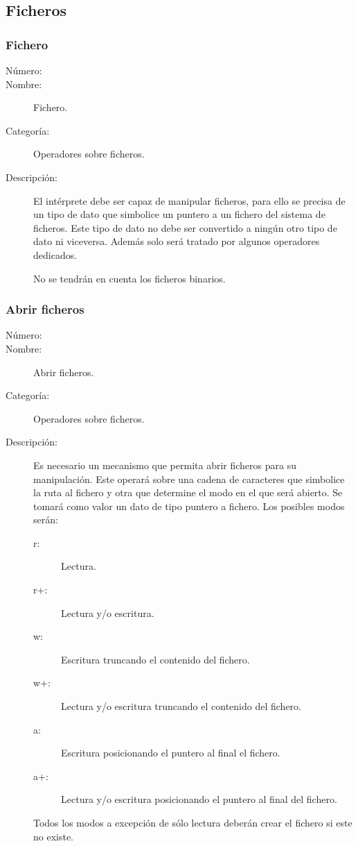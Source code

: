 \subsection{Ficheros}
\subsubsection{Fichero}
	\begin{description}
		\item [Número:] \cn
		\item [Nombre:] Fichero.
		\item [Categoría:] Operadores sobre ficheros.
		\item [Descripción:] El intérprete debe ser capaz de manipular ficheros, para ello se precisa de un tipo de dato
		que simbolice un puntero a un fichero del sistema de ficheros. Este tipo de dato no debe ser convertido a ningún otro
		tipo de dato ni viceversa. Además solo será tratado por algunos operadores dedicados. 
		
		No se tendrán en cuenta los  ficheros binarios.
	\end{description}

\subsubsection{Abrir ficheros}
	\begin{description}
		\item [Número:] \cn
		\item [Nombre:] Abrir ficheros.
		\item [Categoría:] Operadores sobre ficheros.
		\item [Descripción:] Es necesario un mecanismo que permita abrir ficheros para su manipulación. Este operará sobre
		una cadena de caracteres que simbolice la ruta al fichero y otra que determine el modo en el que será abierto. Se 
		tomará como valor un dato de tipo puntero a fichero. Los posibles modos serán:
		
		\begin{description}
			\item [r:] Lectura.
			\item [r+:] Lectura y/o escritura.
			\item [w:] Escritura truncando el contenido del fichero.
			\item [w+:] Lectura y/o escritura truncando el contenido del fichero.
			\item [a:] Escritura posicionando el puntero al final el fichero.
			\item [a+:] Lectura y/o escritura posicionando el puntero al final del fichero.
		\end{description}
		
		Todos los modos a excepción de sólo lectura deberán crear el fichero si este no existe.  
	\end {description}

